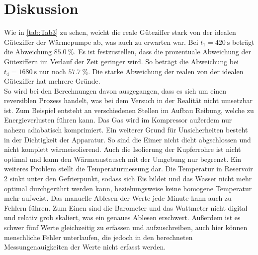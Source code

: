 \section{Diskussion}
\label{sec:Diskussion}

Wie in \autoref{tab:Tab3} zu sehen, weicht die reale Güteziffer stark von der idealen Güteziffer der Wärmepumpe ab, was auch zu erwarten war.
Bei $t_1=\qty{420}{\second}$ beträgt die Abweichung $\qty{85.0}{\percent}$. Es ist festzustellen, dass die prozentuale Abweichung der Güteziffern
im Verlauf der Zeit geringer wird. So beträgt die Abweichung bei $t_4=\qty{1680}{\second}$ nur noch $\qty{57.7}{\percent}$.
Die starke Abweichung der realen von der idealen Güteziffer hat mehrere Gründe.\\
So wird bei den Berechnungen davon ausgegangen, dass es sich um einen reversiblen Prozess handelt, was bei dem Versuch in der Realität nicht umsetzbar ist.
Zum Beispiel entsteht an verschiedenen Stellen im Aufbau Reibung, welche zu Energieverlusten führen kann.
Das Gas wird im Kompressor außerdem nur nahezu adiabatisch komprimiert.
Ein weiterer Grund für Unsicherheiten besteht in der Dichtigkeit der Apparatur. So sind die Eimer nicht dicht abgschlossen und nicht komplett wärmeisolierend.
Auch die Isolierung der Kupferrohre ist nicht optimal und kann den Wärmeaustausch mit der Umgebung nur begrenzt.
Ein weiteres Problem stellt die Temperaturmessung dar. Die Temperatur in Reservoir 2 sinkt unter den Gefrierpunkt, sodass sich Eis bildet und das Wasser
nicht mehr optimal durchgerührt werden kann, beziehungsweise keine homogene Temperatur mehr aufweist.
Das manuelle Ablesen der Werte jede Minute kann auch zu Fehlern führen. Zum Einen sind die Barometer und das Wattmeter nicht digital und relativ grob skaliert, was ein
genaues Ablesen erschwert. Außerdem ist es schwer fünf Werte gleichzeitig zu erfassen und aufzuschreiben, auch hier können menschliche Fehler unterlaufen,
die jedoch in den berechneten Messungenauigkeiten der Werte nicht erfasst werden.

